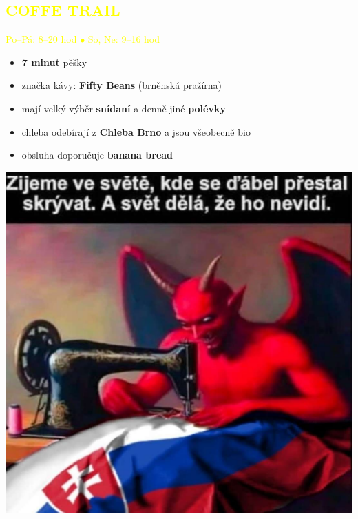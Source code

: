 \documentclass{article}
\newcommand{\podnadpisy}[1]{
  \subsection*{\textcolor{yellow}{#1}}
}
\begin{document}
\noindent \begin{minipage}{0.7\textwidth}
    \podnadpisy{COFFE TRAIL}
  \textcolor{yellow}{Po--Pá: 8--20 hod $\bullet$ So, Ne: 9--16 hod}
  \vspace{5pt}
  \small
  \begin{itemize}[leftmargin=10pt]
    \item \textbf{7 minut} pěšky
    \item značka kávy: \textbf{Fifty Beans} (brněnská pražírna)
    \item mají velký výběr \textbf{snídaní} a denně jiné \textbf{polévky}
    \item chleba odebírají z \textbf{Chleba Brno} a jsou všeobecně bio
    \item obsluha doporučuje \textbf{banana bread}
  \end{itemize}
\end{minipage}
\hfill
\begin{minipage}{0.27\textwidth}
  \includegraphics[width=\linewidth]{dulezite.jpg}
\end{minipage}
\end{document}
